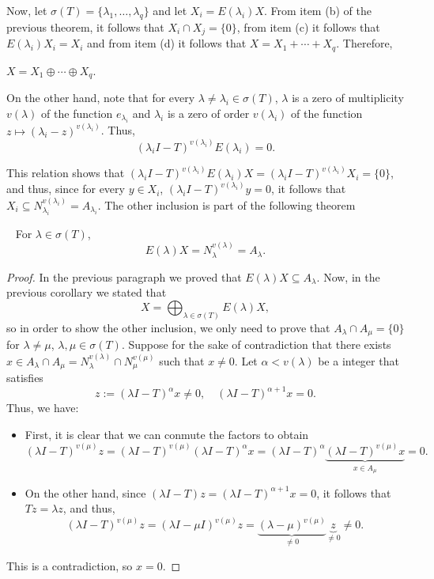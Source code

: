 Now, let $\sigma(T) = \{\lambda_1,\ldots, \lambda_q\}$ and let $X_i = E(\lambda_i) X$. From item (b) of the previous theorem, it follows that $X_i\cap X_j = \{0\}$, from item (c) it follows that $E(\lambda_i) X_i = X_i$ and from item (d) it follows that $X = X_1+\cdots + X_q$. Therefore,

\begin{corollary}
    $X = X_1 \oplus \cdots \oplus X_q $.
\end{corollary}

On the other hand, note that for every $\lambda \neq \lambda_i \in \sigma(T)$, $\lambda$ is a zero of multiplicity $v(\lambda)$ of the function $e_{\lambda_i}$ and $\lambda_i$ is a zero of order $v(\lambda_i)$ of the function $z \mapsto (\lambda_i - z)^{v(\lambda_i)}$. Thus,
\[ (\lambda_i I - T)^{v(\lambda_i)} E(\lambda_i) = 0. \]

This relation shows that $(\lambda_i I - T)^{v(\lambda_i)} E(\lambda_i)X = (\lambda_i I - T)^{v(\lambda_i)} X_i = \{0\}$, and thus, since for every $y \in X_i$, $(\lambda_i I - T)^{v(\lambda_i)} y = 0$, it follows that $X_i \subseteq N_{\lambda_i}^{v(\lambda_i)} = A_{\lambda_i}$. The other inclusion is part of the following theorem

\begin{theorem}~\label{ch2t5}
    For $\lambda \in \sigma(T)$,
    \[ E(\lambda)X = N_\lambda^{v(\lambda)} = A_\lambda. \]
\end{theorem}

\begin{proof}
    In the previous paragraph we proved that $E(\lambda)X \subseteq A_{\lambda}$. Now, in the previous corollary we stated that
    \[ X = \bigoplus_{\lambda \in \sigma(T)} E(\lambda) X, \]
    so in order to show the other inclusion, we only need to prove that $A_\lambda \cap A_\mu = \{0\}$ for $\lambda \neq \mu$, $\lambda,\mu \in \sigma(T)$. Suppose for the sake of contradiction that there exists $x \in A_\lambda \cap A_\mu = N_\lambda^{v(\lambda)} \cap N_\mu^{v(\mu)}$ such that $x \neq 0$. Let $\alpha < v(\lambda)$ be a integer that satisfies
    \[ z := (\lambda I - T)^{\alpha} x \neq 0 ,\quad  (\lambda I - T)^{\alpha+1} x = 0.\]
    Thus, we have:
    \begin{itemize}
        \item First, it is clear that we can conmute the factors to obtain
        \[ (\lambda I - T)^{v(\mu)} z = (\lambda I - T)^{v(\mu)}(\lambda I - T)^{\alpha} x = (\lambda I - T)^{\alpha}\underbrace{(\lambda I - T)^{v(\mu)} x}_{ x \in A_\mu} = 0.  \]
        \item On the other hand, since $(\lambda I - T)z = (\lambda I - T)^{\alpha+1} x = 0$, it follows that $Tz = \lambda z$, and thus,
        \[ (\lambda I - T)^{v(\mu)} z = (\lambda I - \mu I)^{v(\mu)} z = \underbrace{(\lambda - \mu)^{v(\mu)}}_{\neq 0} \underbrace{z}_{\neq 0} \neq 0. \]
    \end{itemize}
    This is a contradiction, so $x = 0$.
\end{proof}

